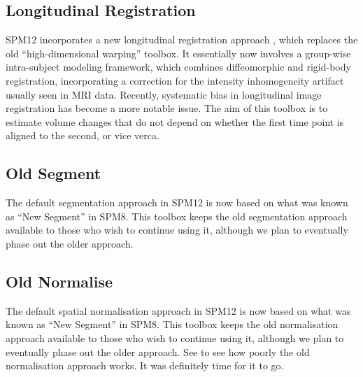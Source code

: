 \documentclass[a4paper,titlepage,openany]{article}
\begin{document}
\subsection{Longitudinal Registration}
SPM12 incorporates a new longitudinal registration approach \cite{ashburner2013symmetric}, which replaces the old ``high-dimensional warping'' toolbox.
It essentially now involves a group-wise intra-subject modeling framework, which combines diffeomorphic \cite{ashburner2011diffeomorphic} and rigid-body registration, incorporating a correction for the intensity inhomogeneity artifact usually seen in MRI data.
Recently, systematic bias in longitudinal image registration has become a more notable issue.
The aim of this toolbox is to estimate volume changes that do not depend on whether the first time point is aligned to the second, or vice verca.

\subsection{Old Segment}
The default segmentation approach in SPM12 is now based on what was known as ``New Segment'' in SPM8.
This toolbox keeps the old segmentation approach available to those who wish to continue using it, although we plan to eventually phase out the older approach.

\subsection{Old Normalise}
The default spatial normalisation approach in SPM12 is now based on what was known as ``New Segment'' in SPM8.
This toolbox keeps the old normalisation approach available to those who wish to continue using it, although we plan to eventually phase out the older approach.
See \cite{klein_evaluation} to see how poorly the old normalisation approach works.
It was definitely time for it to go.




\end{document}
